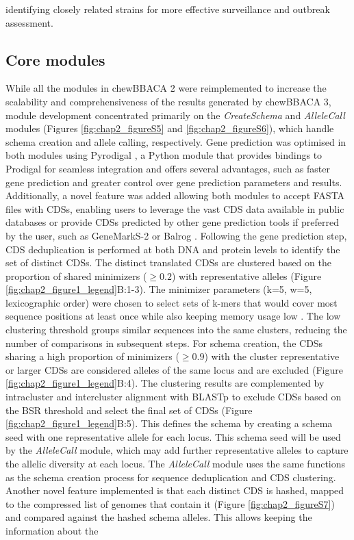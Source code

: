 identifying closely related strains for more effective surveillance and outbreak assessment.

\subsection{Core modules} \label{ssec:core_modules}

While all the modules in chewBBACA 2 were reimplemented to increase the scalability and comprehensiveness of the results generated by chewBBACA 3, module development concentrated primarily on the \textit{CreateSchema} and \textit{AlleleCall} modules (Figures \ref{fig:chap2_figureS5} and \ref{fig:chap2_figureS6}), which handle schema creation and allele calling, respectively. Gene prediction was optimised in both modules using Pyrodigal \citep{larralde_pyrodigal_2022, hyatt_prodigal_2010}, a Python module that provides bindings to Prodigal for seamless integration and offers several advantages, such as faster gene prediction and greater control over gene prediction parameters and results. Additionally, a novel feature was added allowing both modules to accept FASTA files with \ac{CDSs}, enabling users to leverage the vast \ac{CDS} data available in public databases or provide \ac{CDSs} predicted by other gene prediction tools if preferred by the user, such as GeneMarkS-2 or Balrog \citep{lomsadze_modeling_2018, sommer_balrog_2021}. Following the gene prediction step, \ac{CDS} deduplication is performed at both \ac{DNA} and protein levels to identify the set of distinct \ac{CDSs}. The distinct translated \ac{CDSs} are clustered based on the proportion of shared minimizers ($\geq0.2$) with representative alleles \citep{schleimer_winnowing_nodate, roberts_reducing_2004, marcais_improving_2017} (Figure \ref{fig:chap2_figure1_legend}B:1-3). The minimizer parameters (k=5, w=5, lexicographic order) were chosen to select sets of k-mers that would cover most sequence positions at least once while also keeping memory usage low \citep{zheng_improved_2020}. The low clustering threshold groups similar sequences into the same clusters, reducing the number of comparisons in subsequent steps. For schema creation, the \ac{CDSs} sharing a high proportion of minimizers ($\geq0.9$) with the cluster representative or larger \ac{CDSs} are considered alleles of the same locus and are excluded (Figure \ref{fig:chap2_figure1_legend}B:4). The clustering results are complemented by intracluster and intercluster alignment with \ac{BLASTp} to exclude \ac{CDSs} based on the \ac{BSR} threshold and select the final set of \ac{CDSs} (Figure \ref{fig:chap2_figure1_legend}B:5). This defines the schema by creating a schema seed with one representative allele for each locus. This schema seed will be used by the \textit{AlleleCall} module, which may add further representative alleles to capture the allelic diversity at each locus. The \textit{AlleleCall} module uses the same functions as the schema creation process for sequence deduplication and \ac{CDS} clustering. Another novel feature implemented is that each distinct \ac{CDS} is hashed, mapped to the compressed list of genomes that contain it (Figure \ref{fig:chap2_figureS7}) and compared against the hashed schema alleles. This allows keeping the information about the 